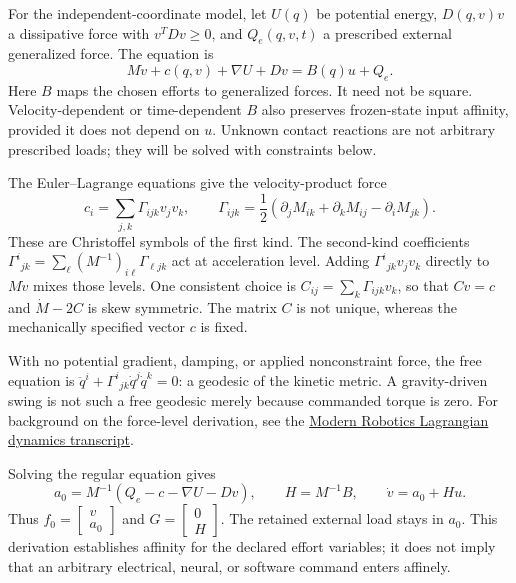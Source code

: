 For the independent-coordinate model, let $U(q)$ be potential energy, $D(q,v)v$ a dissipative force with $v^TDv\ge0$, and $Q_e(q,v,t)$ a prescribed external generalized force. The equation is
\begin{equation}
M\dot v+c(q,v)+\nabla U+Dv=B(q)u+Q_e.
\label{eq:ch3:manipulator}
\end{equation}
Here $B$ maps the chosen efforts to generalized forces. It need not be square. Velocity-dependent or time-dependent $B$ also preserves frozen-state input affinity, provided it does not depend on $u$. Unknown contact reactions are not arbitrary prescribed loads; they will be solved with constraints below.

The Euler--Lagrange equations give the velocity-product force
\begin{equation}
c_i=\sum_{j,k}\Gamma_{ijk}v_jv_k,
\qquad
\Gamma_{ijk}=\frac12\left(\partial_jM_{ik}+\partial_kM_{ij}-\partial_iM_{jk}\right).
\label{eq:ch3:christoffel-formula}
\end{equation}
These are Christoffel symbols of the first kind. The second-kind coefficients $\Gamma^i{}_{jk}=\sum_\ell(M^{-1})_{i\ell}\Gamma_{\ell jk}$ act at acceleration level. Adding $\Gamma^i{}_{jk}v_jv_k$ directly to $M\dot v$ mixes those levels. One consistent choice is $C_{ij}=\sum_k\Gamma_{ijk}v_k$, so that $Cv=c$ and $\dot M-2C$ is skew symmetric. The matrix $C$ is not unique, whereas the mechanically specified vector $c$ is fixed.

With no potential gradient, damping, or applied nonconstraint force, the free equation is $\ddot q^i+\Gamma^i{}_{jk}\dot q^j\dot q^k=0$: a geodesic of the kinetic metric. A gravity-driven swing is not such a free geodesic merely because commanded torque is zero. For background on the force-level derivation, see the \href{https://modernrobotics.northwestern.edu/nu-gm-book-resource/8-1-lagrangian-formulation-of-dynamics-part-2-of-2/}{Modern Robotics Lagrangian dynamics transcript}.

Solving the regular equation gives
\begin{equation}
a_0=M^{-1}(Q_e-c-\nabla U-Dv),\qquad H=M^{-1}B,\qquad \dot v=a_0+Hu.
\label{eq:ch3:forward-dynamics}
\end{equation}
Thus $f_0=\begin{bmatrix}v\\a_0\end{bmatrix}$ and $G=\begin{bmatrix}0\\H\end{bmatrix}$. The retained external load stays in $a_0$. This derivation establishes affinity for the declared effort variables; it does not imply that an arbitrary electrical, neural, or software command enters affinely.


